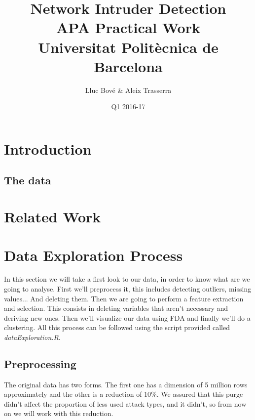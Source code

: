\documentclass[a4paper]{article} %
\title{Network Intruder Detection \\
\large APA Practical Work \\
Universitat Politècnica de Barcelona} %
\author{Lluc Bové \& Aleix Trasserra} %
\date{Q1 2016-17}
\begin{document}
\maketitle %



\section{Introduction}
\subsection{The data}

\section{Related Work}


\section{Data Exploration Process}
In this section we will take a first look to our data, in order to know what are we going to analyse. First we'll preprocess it, this includes detecting outliers, missing values... And deleting them. Then we are going to perform a feature extraction and selection. This consists in deleting variables that aren't necessary and deriving new ones. Then we'll visualize our data using FDA and finally we'll do a clustering. All this process can be followed using the script provided called \textit{dataExploration.R}.\\

\subsection{Preprocessing}
The original data has two forms. The first one has a dimension of 5 million rows approximately and the other is a reduction of 10\%. We assured that this purge didn't affect the proportion of less used attack types, and it didn't, so from now on we will work with this reduction.\\
\end{document}
